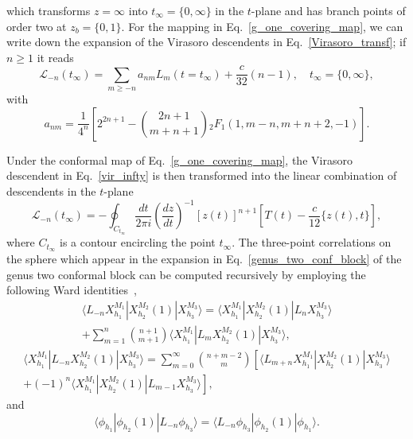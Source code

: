 \documentclass[a4paper,11pt]{article}
\begin{document}
which transforms $z=\infty$ into $t_{\infty}=\{0,\infty\}$
in the $t$-plane and has branch points of order two at $z_b=\{0,1\}$.  For the mapping in Eq.~\eqref{g_one_covering_map}, 
we can write down  the expansion of the Virasoro descendents in Eq.~\eqref{Virasoro_transf};
if $n\geq 1$ it reads
\begin{equation}
\label{g1_1}
 \mathcal{L}_{-n}(t_{\infty})=\sum_{m\geq -n} a_{nm} L_{m}(t=t_{\infty})+\frac{c}{32}(n-1), \quad t_{\infty}=\{0,\infty\},
\end{equation}
with
\begin{equation}
\label{g1_2}
 a_{nm}=\frac{1}{4^n}\left[2^{2n+1}-\binom{2n+1}{m+n+1}{}_2F_1(1, m-n, m+n+2, -1)\right].
\end{equation}

Under the conformal map of
Eq.~\eqref{g_one_covering_map}, the Virasoro descendent in Eq.~\eqref{vir_infty}
is then transformed into the linear combination of descendents in the $t$-plane
\begin{equation}\label{Virasoro_transf}
 \mathcal{L}_{-n}(t_{\infty})=-\oint_{C_{t_{\infty}}}\frac{dt}{2\pi i}
 \left(\frac{dz}{dt}\right)^{-1}[z(t)]^{n+1}
 \left[T(t)-\frac{c}{12}\{z(t), t\}\right],
\end{equation}
where $C_{t_{\infty}}$ is a contour encircling the point $t_{\infty}$.
The three-point correlations on the sphere which appear 
in the expansion in Eq.~\eqref{genus_two_conf_block} of the genus two conformal block can be 
computed recursively by employing the following Ward identities~\cite{Teschner},
\begin{multline}
\label{wardvir1}
 \langle L_{-n}X_{h_1}^{M_1}|X_{h_2}^{M_2}(1)|X_{h_3}^{M_3}\rangle=
 \langle X_{h_1}^{M_1}|X_{h_2}^{M_2}(1)|L_n X_{h_3}^{M_3}\rangle \\
 +\sum_{m= 1}^n \binom{n+1}{m+1}\langle X_{h_1}^{M_1}|L_m X_{h_2}^{M_2}(1)|X_{h_3}^{M_3}\rangle,
\end{multline}
\begin{multline}
\label{wardvir2}
 \langle X_{h_1}^{M_1}|L_{-n}X_{h_2}^{M_2}(1)|X_{h_3}^{M_3}\rangle=
 \sum_{m=0}^\infty\binom{n+m-2}{m}
 \left[\langle L_{m+n} X_{h_1}^{M_1}|X_{h_2}^{M_2}(1)|X_{h_3}^{M_3}\rangle \right.\\ +
 \left. (-1)^n\langle X_{h_1}^{M_1}|X_{h_2}^{M_2}(1)|L_{m-1} X_{h_3}^{M_3}\rangle\right],
\end{multline}
and
\begin{equation}
 \langle \phi_{h_1}|\phi_{h_2}(1)|L_{-n}\phi_{h_3}\rangle=
 \langle L_{-n}\phi_{h_3}|\phi_{h_2}(1)|\phi_{h_1}\rangle.
\end{equation}
\end{document}
